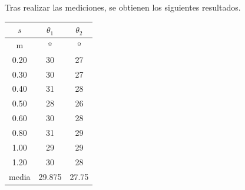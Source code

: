 \documentclass[10pt,a4paper,hidelinks]{article}
\begin{document}
\begin{multicols}{2}
\begin{center}
\end{center}


Tras realizar las mediciones, se obtienen los siguientes resultados.
\begin{center}
\begin{tabular}{ | c | c | c | }
\hline
$s$ & $\theta_1$ & $\theta_2$ \\ \hline
m    &  º &  º \\ \hline \hline
0.20 & 30 & 27 \\ \hline
0.30 & 30 & 27 \\ \hline
0.40 & 31 & 28 \\ \hline
0.50 & 28 & 26 \\ \hline
0.60 & 30 & 28 \\ \hline
0.80 & 31 & 29 \\ \hline
1.00 & 29 & 29 \\ \hline
1.20 & 30 & 28 \\ \hline \hline
media& 29.875 & 27.75 \\ \hline
\end{tabular}
\end{center}


\end{multicols}
\end{document}
